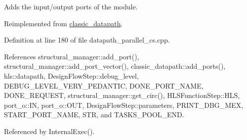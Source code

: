 Adds the input/output ports of the module. 



Reimplemented from \hyperlink{classclassic__datapath_a857c8c07a0bb612dd5e36bba9c48a14d}{classic\+\_\+datapath}.



Definition at line 180 of file datapath\+\_\+parallel\+\_\+cs.\+cpp.



References structural\+\_\+manager\+::add\+\_\+port(), structural\+\_\+manager\+::add\+\_\+port\+\_\+vector(), classic\+\_\+datapath\+::add\+\_\+ports(), hls\+::datapath, Design\+Flow\+Step\+::debug\+\_\+level, D\+E\+B\+U\+G\+\_\+\+L\+E\+V\+E\+L\+\_\+\+V\+E\+R\+Y\+\_\+\+P\+E\+D\+A\+N\+T\+IC, D\+O\+N\+E\+\_\+\+P\+O\+R\+T\+\_\+\+N\+A\+ME, D\+O\+N\+E\+\_\+\+R\+E\+Q\+U\+E\+ST, structural\+\_\+manager\+::get\+\_\+circ(), H\+L\+S\+Function\+Step\+::\+H\+LS, port\+\_\+o\+::\+IN, port\+\_\+o\+::\+O\+UT, Design\+Flow\+Step\+::parameters, P\+R\+I\+N\+T\+\_\+\+D\+B\+G\+\_\+\+M\+EX, S\+T\+A\+R\+T\+\_\+\+P\+O\+R\+T\+\_\+\+N\+A\+ME, S\+TR, and T\+A\+S\+K\+S\+\_\+\+P\+O\+O\+L\+\_\+\+E\+ND.



Referenced by Internal\+Exec().

